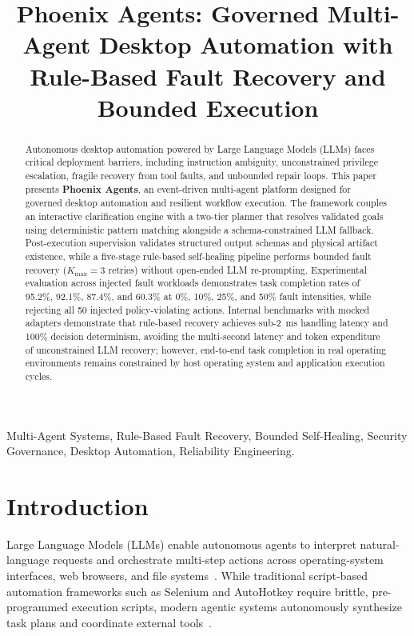 \documentclass[conference]{IEEEtran}
\title{Phoenix Agents: Governed Multi-Agent Desktop Automation with Rule-Based Fault Recovery and Bounded Execution}
\author{
\IEEEauthorblockN{Anonymous Authors}
\IEEEauthorblockA{Paper under double-blind review}
}
\begin{document}
\maketitle

\begin{abstract}
Autonomous desktop automation powered by Large Language Models (LLMs) faces critical deployment barriers, including instruction ambiguity, unconstrained privilege escalation, fragile recovery from tool faults, and unbounded repair loops. This paper presents \textbf{Phoenix Agents}, an event-driven multi-agent platform designed for governed desktop automation and resilient workflow execution. The framework couples an interactive clarification engine with a two-tier planner that resolves validated goals using deterministic pattern matching alongside a schema-constrained LLM fallback. Post-execution supervision validates structured output schemas and physical artifact existence, while a five-stage rule-based self-healing pipeline performs bounded fault recovery ($K_{\text{max}}=3$ retries) without open-ended LLM re-prompting. Experimental evaluation across injected fault workloads demonstrates task completion rates of 95.2\%, 92.1\%, 87.4\%, and 60.3\% at 0\%, 10\%, 25\%, and 50\% fault intensities, while rejecting all 50 injected policy-violating actions. Internal benchmarks with mocked adapters demonstrate that rule-based recovery achieves sub-2~ms handling latency and 100\% decision determinism, avoiding the multi-second latency and token expenditure of unconstrained LLM recovery; however, end-to-end task completion in real operating environments remains constrained by host operating system and application execution cycles.
\end{abstract}

\begin{IEEEkeywords}
Multi-Agent Systems, Rule-Based Fault Recovery, Bounded Self-Healing, Security Governance, Desktop Automation, Reliability Engineering.
\end{IEEEkeywords}

\section{Introduction}

Large Language Models (LLMs) enable autonomous agents to interpret natural-language requests and orchestrate multi-step actions across operating-system interfaces, web browsers, and file systems~\cite{bajoria2026}. While traditional script-based automation frameworks such as Selenium and AutoHotkey require brittle, pre-programmed execution scripts, modern agentic systems autonomously synthesize task plans and coordinate external tools~\cite{garcia2026,babu2026}.
\end{document}
